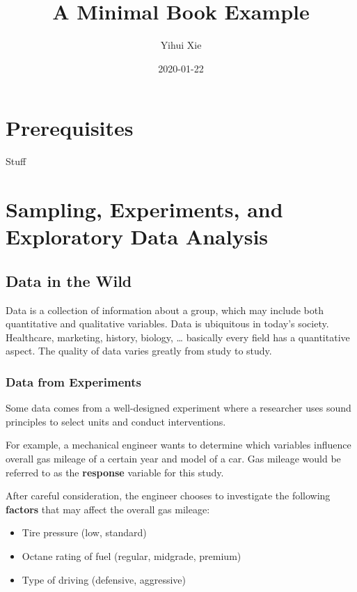 \documentclass[
]{book}
\title{A Minimal Book Example}
\author{Yihui Xie}
\date{2020-01-22}
\providecommand{\tightlist}{%
  \setlength{\itemsep}{0pt}\setlength{\parskip}{0pt}}
\theoremstyle{definition}
\theoremstyle{definition}
\theoremstyle{definition}
\theoremstyle{remark}
\begin{document}
\maketitle

{
\setcounter{tocdepth}{1}
\tableofcontents
}
\hypertarget{prerequisites}{%
\chapter{Prerequisites}\label{prerequisites}}

Stuff

\hypertarget{sampling-experiments-and-exploratory-data-analysis}{%
\chapter{Sampling, Experiments, and Exploratory Data Analysis}\label{sampling-experiments-and-exploratory-data-analysis}}

\hypertarget{data-in-the-wild}{%
\section{Data in the Wild}\label{data-in-the-wild}}

Data is a collection of information about a group, which may include both quantitative and qualitative variables. Data is ubiquitous in today's society. Healthcare, marketing, history, biology, \ldots{} basically every field has a quantitative aspect. The quality of data varies greatly from study to study.

\hypertarget{data-from-experiments}{%
\subsection{Data from Experiments}\label{data-from-experiments}}

Some data comes from a well-designed experiment where a researcher uses sound principles to select units and conduct interventions.

For example, a mechanical engineer wants to determine which variables influence overall gas mileage of a certain year and model of a car. Gas mileage would be referred to as the \textbf{response} variable for this study.

After careful consideration, the engineer chooses to investigate the following \textbf{factors} that may affect the overall gas mileage:

\begin{itemize}
\tightlist
\item
  Tire pressure (low, standard)\\
\item
  Octane rating of fuel (regular, midgrade, premium)\\
\item
  Type of driving (defensive, aggressive)
\end{itemize}
\end{document}
